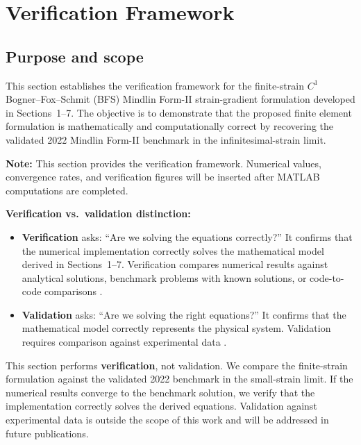 \documentclass[11pt]{article}
\begin{document}
\section{Verification Framework}
\label{sec:verification}

\subsection{Purpose and scope}
\label{ssec:s8_purpose}

This section establishes the verification framework for the finite-strain
$C^{1}$ Bogner--Fox--Schmit (BFS) Mindlin Form-II strain-gradient
formulation developed in Sections~1--7. The objective is to demonstrate
that the proposed finite element formulation is mathematically and
computationally correct by recovering the validated 2022 Mindlin
Form-II benchmark in the infinitesimal-strain limit.

\textbf{Note:} This section provides the verification framework. Numerical values, convergence rates, and verification figures will be inserted after MATLAB computations are completed.

\textbf{Verification vs.\ validation distinction:}

\begin{itemize}
\item \textbf{Verification} asks: ``Are we solving the equations
  correctly?'' It confirms that the numerical implementation correctly
  solves the mathematical model derived in Sections~1--7. Verification
  compares numerical results against analytical solutions, benchmark
  problems with known solutions, or code-to-code comparisons
  \cite{OberkampfTrucano2002,ASME_Verification_2012}.

\item \textbf{Validation} asks: ``Are we solving the right equations?''
  It confirms that the mathematical model correctly represents the
  physical system. Validation requires comparison against experimental
  data \cite{OberkampfTrucano2002,ASME_Verification_2012}.
\end{itemize}

This section performs \textbf{verification}, not validation. We compare
the finite-strain formulation against the validated 2022 benchmark
\cite{TorabiNiiranen2022} in the small-strain limit. If the numerical
results converge to the benchmark solution, we verify that the
implementation correctly solves the derived equations. Validation
against experimental data is outside the scope of this work and will be
addressed in future publications.
\end{document}
